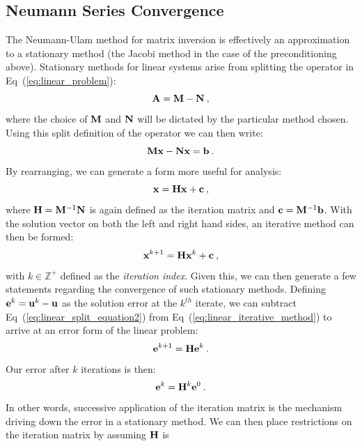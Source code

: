 \documentclass[letterpaper,12pt]{article}
\begin{document}
\subsection{Neumann Series Convergence}
The Neumann-Ulam method for matrix inversion is effectively an
approximation to a stationary method (the Jacobi method in the case of
the preconditioning above). Stationary methods for linear systems
arise from splitting the operator in Eq~(\ref{eq:linear_problem}):
\begin{equation}
  \mathbf{A} = \mathbf{M} - \mathbf{N}\:,
  \label{eq:split_linear_operator}
\end{equation}
where the choice of $\mathbf{M}$ and $\mathbf{N}$ will be dictated by the
particular method chosen. Using this split definition of the operator
we can then write:
\begin{equation}
  \mathbf{M}\mathbf{x} - \mathbf{N}\mathbf{x} = \mathbf{b}\:.
  \label{eq:linear_split_equation1}
\end{equation}
By rearranging, we can generate a form more useful for analysis:
\begin{equation}
  \mathbf{x} = \mathbf{H}\mathbf{x} + \mathbf{c}\:,
  \label{eq:linear_split_equation2}
\end{equation}
where $\mathbf{H}=\mathbf{M}^{-1}\mathbf{N}$ is again defined as the iteration
matrix and $\mathbf{c}=\mathbf{M}^{-1}\mathbf{b}$. With the solution vector on
both the left and right hand sides, an iterative method can then be
formed:
\begin{equation}
  \mathbf{x}^{k+1} = \mathbf{H}\mathbf{x}^k + \mathbf{c}\:,
  \label{eq:linear_iterative_method}
\end{equation}
with $k \in \mathbb{Z}^+$ defined as the \textit{iteration
  index}. Given this, we can then generate a few statements regarding
the convergence of such stationary methods. Defining $\mathbf{e}^k =
\mathbf{u}^k - \mathbf{u}$ as the solution error at the $k^{th}$ iterate, we
can subtract Eq~(\ref{eq:linear_split_equation2}) from
Eq~(\ref{eq:linear_iterative_method}) to arrive at an error form of
the linear problem:
\begin{equation}
  \mathbf{e}^{k+1} = \mathbf{H}\mathbf{e}^k\:. 
  \label{eq:linear_iterative_error}
\end{equation}
Our error after $k$ iterations is then:
\begin{equation}
  \mathbf{e}^{k} = \mathbf{H}^k\mathbf{e}^0\:. 
  \label{eq:linear_k_iter_error}
\end{equation}
In other words, successive application of the iteration matrix is the
mechanism driving down the error in a stationary method. We can then
place restrictions on the iteration matrix by assuming $\mathbf{H}$ is
\end{document}

